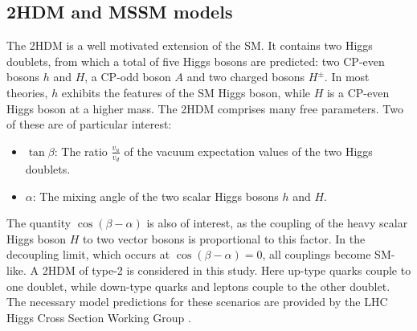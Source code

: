 \subsection*{2HDM and MSSM models}
The 2HDM is a well motivated extension of the SM. It contains two Higgs doublets, from which a total of five Higgs bosons are predicted: 
two CP-even bosons $h$ and $H$, a CP-odd boson $A$ and two charged bosons $H^\pm$. In most theories, $h$ exhibits the features of the SM Higgs boson, while $H$ is a CP-even Higgs boson at a higher mass. The 2HDM comprises many free parameters. Two of these are of particular interest:
\begin{itemize}
\item $\tan\beta$: The ratio $\frac{v_u}{v_d}$ of the vacuum expectation values of the two Higgs doublets.
\item $\alpha$: The mixing angle of the two scalar Higgs bosons $h$ and $H$.
\end{itemize}
The quantity $\cos(\beta-\alpha)$ is also of interest, as the coupling of the heavy scalar Higgs boson $H$ to two vector bosons is proportional to this factor. In the decoupling limit, which occurs at $\cos(\beta-\alpha)=0$, all couplings become SM-like.
A 2HDM of type-2 is considered in this study. Here up-type quarks couple to one doublet, while down-type quarks and leptons couple to the other doublet.\\ 
\newline
The necessary model predictions for these scenarios are provided by the LHC Higgs Cross Section Working Group \cite{bsmhiggsxsecs}. 
